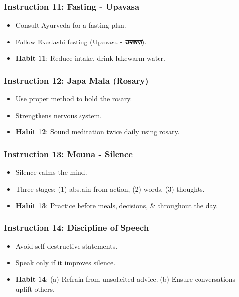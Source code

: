 \begin{frame}[fragile]\frametitle{Instruction 11: Fasting - Upavasa}
      \begin{itemize}
          \item Consult Ayurveda for a fasting plan.
          \item Follow Ekadashi fasting (Upavasa - \textbf{\textit{उपवास}}).
          \item \textbf{Habit 11}: Reduce intake, drink lukewarm water.
      \end{itemize}
\end{frame}

\begin{frame}[fragile]\frametitle{Instruction 12: Japa Mala (Rosary)}
      \begin{itemize}
          \item Use proper method to hold the rosary.
          \item Strengthens nervous system.
          \item \textbf{Habit 12}: Sound meditation twice daily using rosary.
      \end{itemize}
\end{frame}

\begin{frame}[fragile]\frametitle{Instruction 13: Mouna - Silence}
      \begin{itemize}
          \item Silence calms the mind.
          \item Three stages: (1) abstain from action, (2) words, (3) thoughts.
          \item \textbf{Habit 13}: Practice before meals, decisions, \& throughout the day.
      \end{itemize}
\end{frame}

\begin{frame}[fragile]\frametitle{Instruction 14: Discipline of Speech}
      \begin{itemize}
          \item Avoid self-destructive statements.
          \item Speak only if it improves silence.
          \item \textbf{Habit 14}: (a) Refrain from unsolicited advice. (b) Ensure conversations uplift others.
      \end{itemize}
\end{frame}

